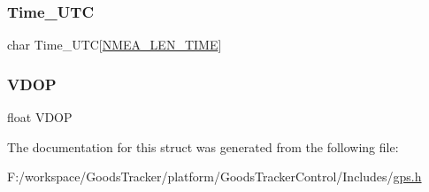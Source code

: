 \subsubsection{\texorpdfstring{Time\+\_\+\+U\+TC}{Time\_UTC}}
{\footnotesize\ttfamily char Time\+\_\+\+U\+TC\mbox{[}\hyperlink{_n_m_e_a_frame_8h_a2484310edd727749c7c9b3501d978913}{N\+M\+E\+A\+\_\+\+L\+E\+N\+\_\+\+T\+I\+ME}\mbox{]}}

\mbox{\label{struct_g_p_s_a560dd464380970f473ab405e6bd61169}} 
\subsubsection{\texorpdfstring{V\+D\+OP}{VDOP}}
{\footnotesize\ttfamily float V\+D\+OP}



The documentation for this struct was generated from the following file\+:\begin{DoxyCompactItemize}
\item 
F\+:/workspace/\+Goods\+Tracker/platform/\+Goods\+Tracker\+Control/\+Includes/\hyperlink{gps_8h}{gps.\+h}\end{DoxyCompactItemize}
